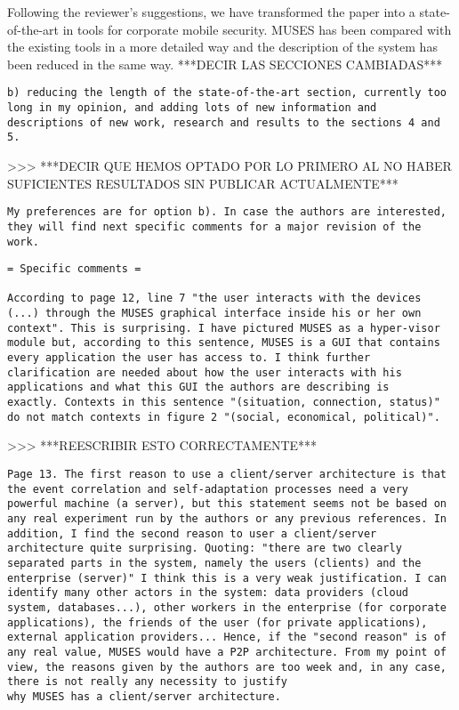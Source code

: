\documentclass[preprint]{elsarticle}
\begin{document}
{\begin{itemize}
Following the reviewer's suggestions, we have transformed the paper
into a state-of-the-art in tools for corporate mobile security. MUSES
has been compared with the existing tools in a more detailed way and
the description of the system has been reduced in the same way.  
***DECIR LAS SECCIONES CAMBIADAS***

\begin{verbatim}
b) reducing the length of the state-of-the-art section, currently too
long in my opinion, and adding lots of new information and
descriptions of new work, research and results to the sections 4 and
5. 
\end{verbatim}

>>> ***DECIR QUE HEMOS OPTADO POR LO PRIMERO AL NO HABER SUFICIENTES RESULTADOS SIN PUBLICAR ACTUALMENTE***

\begin{verbatim}
My preferences are for option b). In case the authors are interested,
they will find next specific comments for a major revision of the
work.
\end{verbatim}


\begin{verbatim}
= Specific comments =

According to page 12, line 7 "the user interacts with the devices
(...) through the MUSES graphical interface inside his or her own
context". This is surprising. I have pictured MUSES as a hyper-visor
module but, according to this sentence, MUSES is a GUI that contains
every application the user has access to. I think further
clarification are needed about how the user interacts with his
applications and what this GUI the authors are describing is
exactly. Contexts in this sentence "(situation, connection, status)"
do not match contexts in figure 2 "(social, economical, political)".
\end{verbatim}

>>> ***REESCRIBIR ESTO CORRECTAMENTE***

\begin{verbatim}
Page 13. The first reason to use a client/server architecture is that
the event correlation and self-adaptation processes need a very
powerful machine (a server), but this statement seems not be based on
any real experiment run by the authors or any previous references. In
addition, I find the second reason to user a client/server
architecture quite surprising. Quoting: "there are two clearly
separated parts in the system, namely the users (clients) and the
enterprise (server)" I think this is a very weak justification. I can
identify many other actors in the system: data providers (cloud
system, databases...), other workers in the enterprise (for corporate
applications), the friends of the user (for private applications),
external application providers... Hence, if the "second reason" is of
any real value, MUSES would have a P2P architecture. From my point of
view, the reasons given by the authors are too week and, in any case,
there is not really any necessity to justify 
why MUSES has a client/server architecture.
\end{verbatim}


\end{itemize}}
\end{document}

